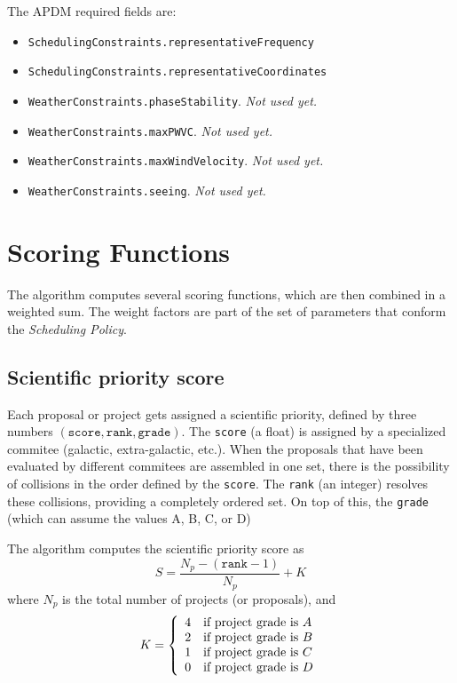 \documentclass{article}
\begin{document}
The APDM required fields are:
\begin{itemize}
\item {\tt SchedulingConstraints.representativeFrequency}
\item {\tt SchedulingConstraints.representativeCoordinates}
\item {\tt WeatherConstraints.phaseStability}. {\em Not used yet.}
\item {\tt WeatherConstraints.maxPWVC}. {\em Not used yet.}
\item {\tt WeatherConstraints.maxWindVelocity}. {\em Not used yet.}
\item {\tt WeatherConstraints.seeing}. {\em Not used yet.}
\end{itemize}

\section{Scoring Functions}

The algorithm computes several scoring functions, which are then combined in a
weighted sum. The weight factors are part of the set of parameters that conform
the {\em Scheduling Policy}.

\subsection{Scientific priority score}

Each proposal or project gets assigned a scientific priority, defined by three numbers
$(\mathtt{score},\mathtt{rank},\mathtt{grade})$. The {\tt score} (a float) is assigned by
a specialized commitee (galactic, extra-galactic, etc.). When the proposals that have
been evaluated by different commitees are assembled in one set, there is the possibility
of collisions in the order defined by the {\tt score}. The {\tt rank} (an integer) resolves these
collisions, providing a completely ordered set. On top of this, the {\tt grade} (which can assume
the values A, B, C, or D)

The algorithm computes the scientific priority score as
$$
S = \frac{N_p - (\mathtt{rank} - 1)}{N_p} + K
$$
where $N_p$ is the total number of projects (or proposals), and \\
$$
K = \left\{
    \begin{array}{l l}
    4 & \text{if project grade is $A$} \\
    2 & \text{if project grade is $B$}\\
    1 & \text{if project grade is $C$}\\
    0 & \text{if project grade is $D$}
    \end{array} \right . 
$$
\end{document}
